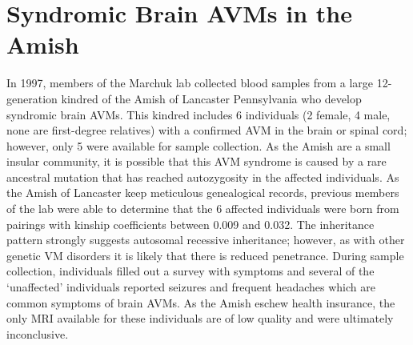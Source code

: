 \section{Syndromic Brain AVMs in the Amish}
In 1997, members of the Marchuk lab collected blood samples from a large 12-generation kindred of the Amish of Lancaster Pennsylvania who develop syndromic brain AVMs. This kindred includes 6 individuals (2 female, 4 male, none are first-degree relatives) with a confirmed AVM in the brain or spinal cord; however, only 5 were available for sample collection. As the Amish are a small insular community, it is possible that this AVM syndrome is caused by a rare ancestral mutation that has reached autozygosity in the affected individuals. As the Amish of Lancaster keep meticulous genealogical records, previous members of the lab were able to determine that the 6 affected individuals were born from pairings with kinship coefficients between 0.009 and 0.032. The inheritance pattern strongly suggests autosomal recessive inheritance; however, as with other genetic VM disorders it is likely that there is reduced penetrance. During sample collection, individuals filled out a survey with symptoms and several of the `unaffected' individuals reported seizures and frequent headaches which are common symptoms of brain AVMs. As the Amish eschew health insurance, the only MRI available for these individuals are of low quality and were ultimately inconclusive. 

